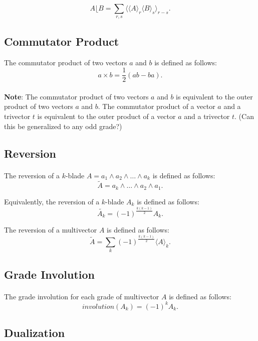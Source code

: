 \documentclass{article}
\begin{document}
$$A\lfloor B = \sum_{r,s} \langle \langle A \rangle_{r} \langle B \rangle_{s} \rangle_{r - s}.$$

\subsection{\textbf{Commutator Product}}
The commutator product of two vectors $a$ and $b$ is defined as follows: 
$$a \times b = \frac{1}{2}(ab - ba).$$

\paragraph{}
    \textbf{Note}: The commutator product of two vectors $a$ and $b$ is equivalent to 
    the outer product of two vectors $a$ and $b$. The commutator product of a vector $a$ and a trivector $t$ 
    is equivalent to the outer product of a vector $a$ and a trivector $t$. (Can this be generalized to any odd grade?)


\subsection{\textbf{Reversion}}

\paragraph{}The reversion of a $k$-blade $A = a_1 \wedge a_2 \wedge \ldots \wedge a_k$ is defined as follows:
$$\tilde{A} = a_k \wedge \ldots \wedge a_2 \wedge a_1.$$

Equivalently, the reversion of a $k$-blade $A_k$ is defined as follows:
$$\tilde{A_k} = (-1)^{\frac{k(k-1)}{2}} A_k.$$

The reversion of a multivector $A$ is defined as follows:
$$\tilde{A} = \sum_{k}^{} (-1)^{\frac{k(k-1)}{2}} \langle A \rangle_k .$$

\subsection{\textbf{Grade Involution}}

\paragraph{}The grade involution for each grade of multivector $A$ is defined as follows:
$$involution(A_k) = (-1)^{k} A_k .$$

\subsection{\textbf{Dualization}}
\end{document}
